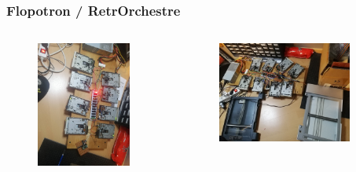 \begin{frame}
\begin{columns}
\begin{column}{0.35\textwidth}
\begin{figure}[H]
	\end{figure}
\end{column}
\end{columns}
\end{frame}

\begin{frame}
\frametitle{Flopotron / RetrOrchestre}
\begin{columns}
\begin{column}{0.35\textwidth}
	\begin{figure}[H]
		\centering
		\includegraphics[width=0.9\textwidth]{flopotron1.jpg}
	\end{figure}
\end{column}
\begin{column}{0.65\textwidth}
	\begin{figure}[H]
		\centering
		\includegraphics[width=0.86\textwidth]{flopotron2.jpg}

\end{figure}
\end{column}
\end{columns}
\end{frame}
